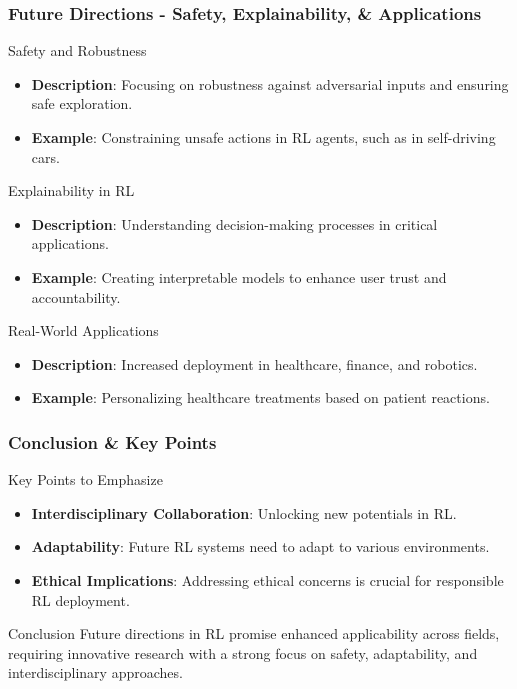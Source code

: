 \documentclass[aspectratio=169]{beamer}
\begin{document}
\begin{frame}[fragile]
    \frametitle{Future Directions - Safety, Explainability, & Applications}
    \begin{block}{Safety and Robustness}
        \begin{itemize}
            \item \textbf{Description}: Focusing on robustness against adversarial inputs and ensuring safe exploration.
            \item \textbf{Example}: Constraining unsafe actions in RL agents, such as in self-driving cars.
        \end{itemize}
    \end{block}
    
    \begin{block}{Explainability in RL}
        \begin{itemize}
            \item \textbf{Description}: Understanding decision-making processes in critical applications.
            \item \textbf{Example}: Creating interpretable models to enhance user trust and accountability.
        \end{itemize}
    \end{block}
    
    \begin{block}{Real-World Applications}
        \begin{itemize}
            \item \textbf{Description}: Increased deployment in healthcare, finance, and robotics.
            \item \textbf{Example}: Personalizing healthcare treatments based on patient reactions.
        \end{itemize}
    \end{block}
\end{frame}

\begin{frame}[fragile]
    \frametitle{Conclusion & Key Points}
    \begin{block}{Key Points to Emphasize}
        \begin{itemize}
            \item \textbf{Interdisciplinary Collaboration}: Unlocking new potentials in RL.
            \item \textbf{Adaptability}: Future RL systems need to adapt to various environments.
            \item \textbf{Ethical Implications}: Addressing ethical concerns is crucial for responsible RL deployment.
        \end{itemize}
    \end{block}

    \begin{block}{Conclusion}
        Future directions in RL promise enhanced applicability across fields, requiring innovative research with a strong focus on safety, adaptability, and interdisciplinary approaches.
    \end{block}
\end{frame}
\end{document}
